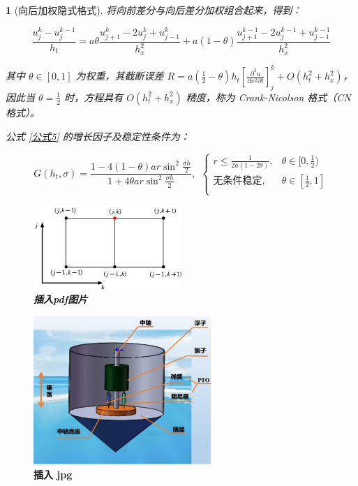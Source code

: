 \documentclass[zihao=5,UTF8]{report}
\theoremstyle{MyTheoremStyle} %
\theoremstyle{MySubsubsectionStyle} %
\newtheorem{definition}{}
\begin{document}
\begin{definition}[向后加权隐式格式]

将向前差分与向后差分加权组合起来，得到：

\begin{equation}\label{公式5}
    \frac{u_{j}^{k}-u_{j}^{k-1}}{h_t}=a\theta\frac{u_{j+1}^{k}-2u_{j}^{k}+u_{j-1}^{k}}{h_x^2}+a(1-\theta)\frac{u_{j+1}^{k-1}-2u_{j}^{k-1}+u_{j-1}^{k-1}}{h_x^2}
\end{equation}

其中 $\theta \in [0, 1]$ 为权重，其截断误差 $R = a\left(\frac{1}{2}-\theta\right)h_t\left[\frac{\partial^{3}u}{\partial x^{2}\partial t}\right]_{j}^{k}+O(h_t^{2}+h_x^2)$，因此当 $\theta = \frac{1}{2}$ 时，方程具有 $O(h_t^{2}+h_x^2)$ 精度，称为 Crank-Nicolson 格式（CN 格式）。


公式 \ref{公式5} 的增长因子及稳定性条件为：

\begin{equation}
    G(h_t,\sigma)=\frac{1-4(1-\theta)ar\sin^2\frac{\sigma h}2}{1+4\theta ar\sin^2\frac{\sigma h}2}, \ \ 
    \begin{cases}
        r\leqslant\frac{1}{2a(1-2\theta)}, & \theta \in [0, \frac{1}{2}) \\ 
        \text{无条件稳定}, & \theta \in [\frac{1}{2}, 1] \\ 
    \end{cases}
\end{equation}

\begin{figure}[H]
    \centering
    \includegraphics[width=0.5\textwidth]{assets/差分格式示意图.pdf}
    \caption{\textbf{插入pdf图片}}\label{插入pdf图片}
\end{figure}
\end{definition}

\begin{figure}[H]
    \centering
    \includegraphics[width=0.6\textwidth]{assets/波浪能装置示意图.jpg}
    \caption{\textbf{插入 jpg}}\label{插入 jpg}
\end{figure}
\end{document}
